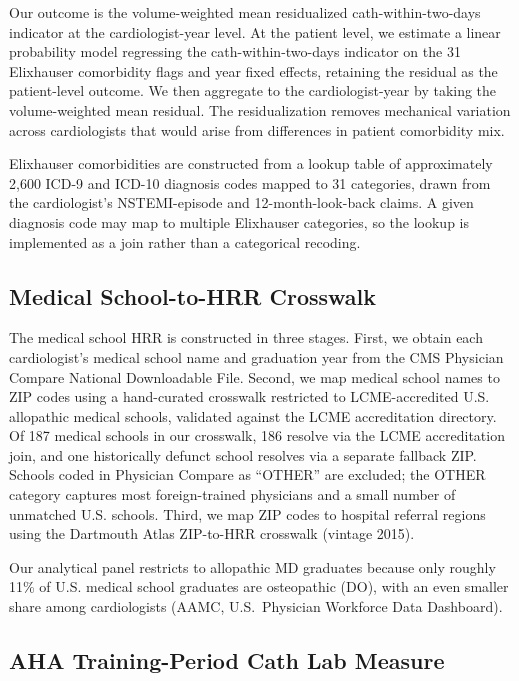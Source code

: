 \documentclass[12pt]{article}
\begin{document}
Our outcome is the volume-weighted mean residualized cath-within-two-days indicator at the cardiologist-year level. At the patient level, we estimate a linear probability model regressing the cath-within-two-days indicator on the 31 Elixhauser comorbidity flags and year fixed effects, retaining the residual as the patient-level outcome. We then aggregate to the cardiologist-year by taking the volume-weighted mean residual. The residualization removes mechanical variation across cardiologists that would arise from differences in patient comorbidity mix.

Elixhauser comorbidities are constructed from a lookup table of approximately 2,600 ICD-9 and ICD-10 diagnosis codes mapped to 31 categories, drawn from the cardiologist's NSTEMI-episode and 12-month-look-back claims. A given diagnosis code may map to multiple Elixhauser categories, so the lookup is implemented as a join rather than a categorical recoding.

\subsection{Medical School-to-HRR Crosswalk}

The medical school HRR is constructed in three stages. First, we obtain each cardiologist's medical school name and graduation year from the CMS Physician Compare National Downloadable File. Second, we map medical school names to ZIP codes using a hand-curated crosswalk restricted to LCME-accredited U.S. allopathic medical schools, validated against the LCME accreditation directory. Of 187 medical schools in our crosswalk, 186 resolve via the LCME accreditation join, and one historically defunct school resolves via a separate fallback ZIP. Schools coded in Physician Compare as ``OTHER'' are excluded; the OTHER category captures most foreign-trained physicians and a small number of unmatched U.S. schools. Third, we map ZIP codes to hospital referral regions using the Dartmouth Atlas ZIP-to-HRR crosswalk (vintage 2015).

Our analytical panel restricts to allopathic MD graduates because only roughly 11\% of U.S. medical school graduates are osteopathic (DO), with an even smaller share among cardiologists (AAMC, U.S.\ Physician Workforce Data Dashboard).

\subsection{AHA Training-Period Cath Lab Measure}
\end{document}
